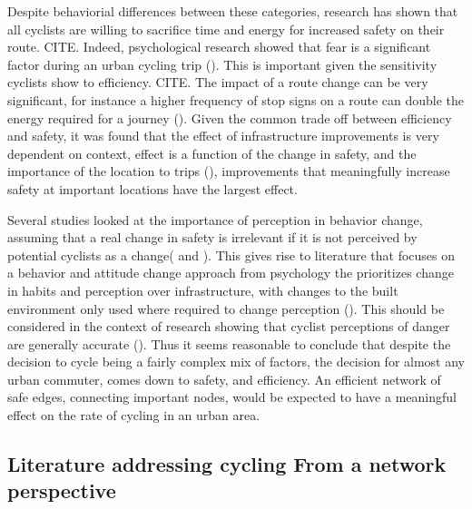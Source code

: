 \documentclass[11pt]{article} %
\begin{document}
Despite behaviorial differences between these categories, research has shown that all cyclists are willing to sacrifice time and energy for increased safety on their route. CITE. Indeed, psychological research showed that fear is a significant factor during an urban cycling trip (\cite{ellett2018state}). This is important given the sensitivity cyclists show to efficiency. CITE. The impact of a route change can be very significant, for instance a higher frequency of stop signs on a route can double the energy required for a journey (\cite{fajans2001bicyclists}). Given the common trade off between efficiency and safety, it was found that the effect of infrastructure improvements is very dependent on context, effect is a function of the change in safety, and the importance of the location to trips (\cite{kondo2018bike}), improvements that meaningfully increase safety at important locations have the largest effect. 

Several studies looked at the importance of perception in behavior change, assuming that a real change in safety is irrelevant if it is not perceived by potential cyclists as a change(\cite{li2012physical} and \cite{parkin2007models}). This gives rise to literature that focuses on a behavior and attitude change approach from psychology the prioritizes change in habits and perception over infrastructure, with changes to the built environment only used where required to change perception (\cite{savan2017integrated}). This should be considered in the context of research showing that cyclist perceptions of danger are generally accurate (\cite{vandenbulcke2014predicting}). Thus it seems reasonable to conclude that despite the decision to cycle being a fairly complex mix of factors, the decision for almost any urban commuter, comes down to safety, and efficiency. An efficient network of safe edges, connecting important nodes, would be expected to have a meaningful effect on the rate of cycling in an urban area.  


\subsection{Literature addressing cycling From a network perspective}
\end{document}
